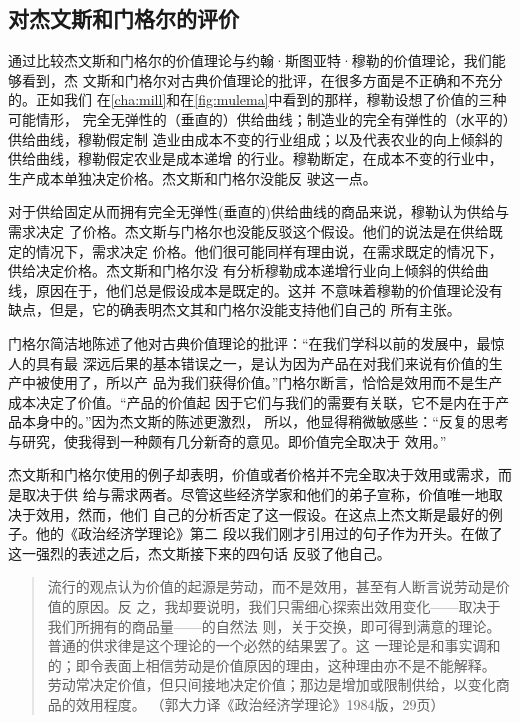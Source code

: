 \subsection{对杰文斯和门格尔的评价}

通过比较杰文斯和门格尔的价值理论与约翰·斯图亚特·穆勒的价值理论，我们能够看到，杰
文斯和门格尔对古典价值理论的批评，在很多方面是不正确和不充分的。正如我们
在\cref{cha:mill}和在\cref{fig:mulema}中看到的那样，穆勒设想了价值的三种可能情形，
完全无弹性的（垂直的）供给曲线；制造业的完全有弹性的（水平的）供给曲线，穆勒假定制
造业由成本不变的行业组成；以及代表农业的向上倾斜的供给曲线，穆勒假定农业是成本递增
的行业。穆勒断定，在成本不变的行业中，生产成本单独决定价格。杰文斯和门格尔没能反
驶这一点。

对于供给固定从而拥有完全无弹性(垂直的)供给曲线的商品来说，穆勒认为供给与需求决定
了价格。杰文斯与门格尔也没能反驳这个假设。他们的说法是在供给既定的情况下，需求决定
价格。他们很可能同样有理由说，在需求既定的情况下，供给决定价格。杰文斯和门格尔没
有分析穆勒成本递增行业向上倾斜的供给曲线，原因在于，他们总是假设成本是既定的。这并
不意味着穆勒的价值理论没有缺点，但是，它的确表明杰文其和门格尔没能支持他们自己的
所有主张。

门格尔简洁地陈述了他对古典价值理论的批评：“在我们学科以前的发展中，最惊人的具有最
深远后果的基本错误之一，是认为因为产品在对我们来说有价值的生产中被使用了，所以产
品为我们获得价值。”门格尔断言，恰恰是效用而不是生产成本决定了价值。“产品的价值起
因于它们与我们的需要有关联，它不是内在于产品本身中的。”因为杰文斯的陈述更激烈，
所以，他显得稍微敏感些：“反复的思考与研究，使我得到一种颇有几分新奇的意见。即价值完全取决于
效用。”

杰文斯和门格尔使用的例子却表明，价值或者价格并不完全取决于效用或需求，而是取决于供
给与需求两者。尽管这些经济学家和他们的弟子宣称，价值唯一地取决于效用，然而，他们
自己的分析否定了这一假设。在这点上杰文斯是最好的例子。他的《政治经济学理论》第二
段以我们刚才引用过的句子作为开头。在做了这一强烈的表述之后，杰文斯接下来的四句话
反驳了他自己。

\begin{quotation}
  流行的观点认为价值的起源是劳动，而不是效用，甚至有人断言说劳动是价值的原因。反
  之，我却要说明，我们只需细心探索出效用变化——取决于我们所拥有的商品量——的自然法
  则，关于交换，即可得到满意的理论。普通的供求律是这个理论的一个必然的结果罢了。这
  一理论是和事实调和的；即令表面上相信劳动是价值原因的理由，这种理由亦不是不能解释。
  劳动常决定价值，但只间接地决定价值；那边是增加或限制供给，以变化商品的效用程度。
  （郭大力译《政治经济学理论》1984版，29页）
\end{quotation}


